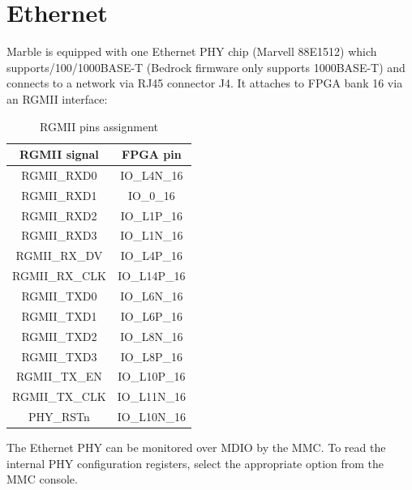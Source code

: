 \documentclass[12pt,oneside,a4]{article}
\begin{document}
\section{Ethernet}
Marble is equipped with one Ethernet PHY chip (Marvell 88E1512) which supports\hfil{}/100/1000BASE-T
(Bedrock firmware only supports 1000BASE-T) and connects to a network via RJ45 connector \hbox{J4}.
It attaches to FPGA bank 16 via an RGMII interface:

\begin{table}[htbp]
\centering
\begin{tabular}{@{}cc@{}}
\toprule
\textbf{RGMII signal}              & \textbf{FPGA pin}                \\ \midrule
RGMII\_RXD0                        & IO\_L4N\_16                      \\
RGMII\_RXD1                        & IO\_0\_16                        \\
RGMII\_RXD2                        & IO\_L1P\_16                      \\
RGMII\_RXD3                        & IO\_L1N\_16                      \\
RGMII\_RX\_DV                      & IO\_L4P\_16                      \\
RGMII\_RX\_CLK                     & IO\_L14P\_16                     \\
RGMII\_TXD0                        & IO\_L6N\_16                      \\
RGMII\_TXD1                        & IO\_L6P\_16                      \\
RGMII\_TXD2                        & IO\_L8N\_16                      \\
RGMII\_TXD3                        & IO\_L8P\_16                      \\
RGMII\_TX\_EN                      & IO\_L10P\_16                     \\
\multicolumn{1}{l}{RGMII\_TX\_CLK} & \multicolumn{1}{l}{IO\_L11N\_16} \\
PHY\_RSTn                          & IO\_L10N\_16                     \\ \bottomrule
\end{tabular}
\caption{RGMII pins assignment}
\label{tab:rgmii}
\end{table}

The Ethernet PHY can be monitored over MDIO by the MMC. To read the internal PHY configuration registers, select the appropriate option from the MMC console.
\end{document}
